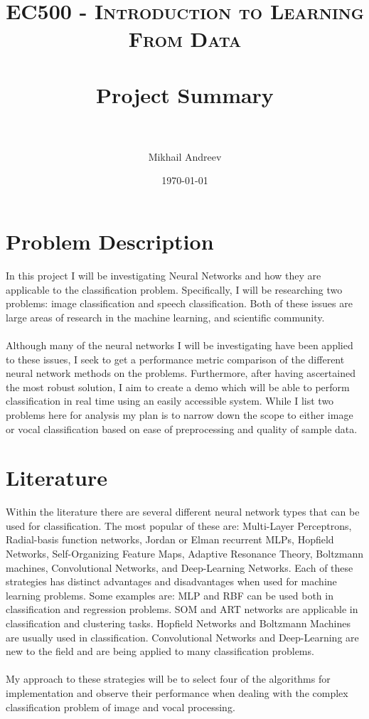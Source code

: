 \documentclass[paper=a4, fontsize=11pt]{scrartcl} %
\title{	
	\normalfont \normalsize 
	\textsc{EC500 - Introduction to Learning From Data} \\ [25pt] %
	\horrule{0.5pt} \\[0.4cm] %
	\huge Project Summary \\ %
	\horrule{2pt} \\[0.5cm] %
}
\author{Mikhail Andreev} %
\date{\normalsize\today} %
\numberwithin{equation}{section} %
\numberwithin{figure}{section} %
\numberwithin{table}{section} %
\begin{document}
	
	\maketitle %
	

	
	
	\section{Problem Description}
	In this project I will be investigating Neural Networks and how they are applicable to the classification problem. Specifically, I will be researching two problems: image classification and speech classification. Both of these issues are large areas of research in the machine learning, and scientific community. 
	\\\\
	Although many of the neural networks I will be investigating have been applied to these issues, I seek to get a performance metric comparison of the different neural network methods on the problems. Furthermore, after having ascertained the most robust solution, I aim to create a demo which will be able to perform classification in real time using an easily accessible system. While I list two problems here for analysis my plan is to narrow down the scope to either image or vocal classification based on ease of preprocessing and quality of sample data. 
	
	\section{Literature}
	Within the literature there are several different neural network types that can be used for classification. The most popular of these are: Multi-Layer Perceptrons, Radial-basis function networks, Jordan or Elman recurrent MLPs, Hopfield Networks, Self-Organizing Feature Maps, Adaptive Resonance Theory, Boltzmann machines, Convolutional Networks, and Deep-Learning Networks. Each of these strategies has distinct advantages and disadvantages when used for machine learning problems. Some examples are: MLP and RBF can be used both in classification and regression problems. SOM and ART networks are applicable in classification and clustering tasks. Hopfield Networks and Boltzmann Machines are usually used in classification. Convolutional Networks and Deep-Learning are new to the field and are being applied to many classification problems.
	\\\\
	My approach to these strategies will be to select four of the algorithms for implementation and observe their performance when dealing with the complex classification problem of image and vocal processing.
	
\end{document}
